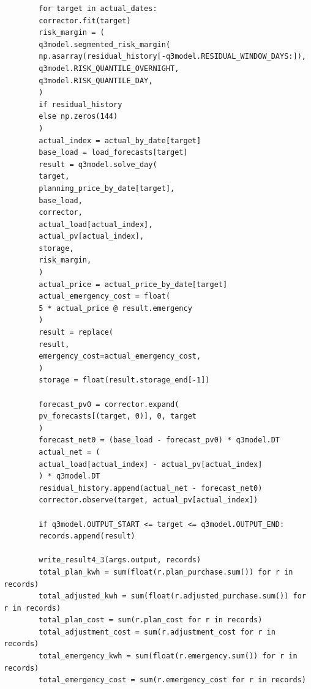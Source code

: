 \documentclass[UTF8]{ctexart}
\begin{document}
\begin{verbatim}
        for target in actual_dates:
        corrector.fit(target)
        risk_margin = (
        q3model.segmented_risk_margin(
        np.asarray(residual_history[-q3model.RESIDUAL_WINDOW_DAYS:]),
        q3model.RISK_QUANTILE_OVERNIGHT,
        q3model.RISK_QUANTILE_DAY,
        )
        if residual_history
        else np.zeros(144)
        )
        actual_index = actual_by_date[target]
        base_load = load_forecasts[target]
        result = q3model.solve_day(
        target,
        planning_price_by_date[target],
        base_load,
        corrector,
        actual_load[actual_index],
        actual_pv[actual_index],
        storage,
        risk_margin,
        )
        actual_price = actual_price_by_date[target]
        actual_emergency_cost = float(
        5 * actual_price @ result.emergency
        )
        result = replace(
        result,
        emergency_cost=actual_emergency_cost,
        )
        storage = float(result.storage_end[-1])
        
        forecast_pv0 = corrector.expand(
        pv_forecasts[(target, 0)], 0, target
        )
        forecast_net0 = (base_load - forecast_pv0) * q3model.DT
        actual_net = (
        actual_load[actual_index] - actual_pv[actual_index]
        ) * q3model.DT
        residual_history.append(actual_net - forecast_net0)
        corrector.observe(target, actual_pv[actual_index])
        
        if q3model.OUTPUT_START <= target <= q3model.OUTPUT_END:
        records.append(result)
        
        write_result4_3(args.output, records)
        total_plan_kwh = sum(float(r.plan_purchase.sum()) for r in records)
        total_adjusted_kwh = sum(float(r.adjusted_purchase.sum()) for r in records)
        total_plan_cost = sum(r.plan_cost for r in records)
        total_adjustment_cost = sum(r.adjustment_cost for r in records)
        total_emergency_kwh = sum(float(r.emergency.sum()) for r in records)
        total_emergency_cost = sum(r.emergency_cost for r in records)
        

\end{verbatim}
\end{document}
